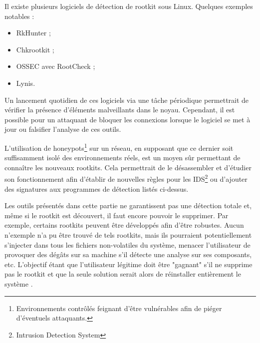 \documentclass[12pt]{article}
\begin{document}
    Il existe plusieurs logiciels de détection de rootkit sous Linux. Quelques exemples notables :
    \begin{itemize}
    	\item RkHunter\cite{rkhunter} ;
    	\item Chkrootkit\cite{chrootkit} ;
    	\item OSSEC avec RootCheck\cite{rootcheck} ;
    	\item Lynis\cite{lynis}.
    \end{itemize}
    
    Un lancement quotidien de ces logiciels via une tâche périodique permettrait de vérifier la présence d'éléments malveillants dans le noyau. Cependant, il est possible pour un attaquant de bloquer les connexions lorsque le logiciel se met à jour ou falsifier l'analyse de ces outils.
    
    
    L'utilisation de honeypots\footnote{Environnements contrôlés feignant d'être vulnérables afin de piéger d'éventuels attaquants.} sur un réseau, en supposant que ce dernier soit suffisamment isolé des environnements réels, est un moyen sûr permettant de connaître les nouveaux rootkits. Cela permettrait de le désassembler et d'étudier son fonctionnement afin d'établir de nouvelles règles pour les IDS\footnote{Intrusion Detection System} ou d'ajouter des signatures aux programmes de détection listés ci-dessus.
   
    Les outils présentés dans cette partie ne garantissent pas une détection totale et, même si le rootkit est découvert, il faut encore pouvoir le supprimer. Par exemple, certains rootkits peuvent être développés afin d'être robustes. Aucun n'exemple n'a pu être trouvé de tels rootkits, mais ils pourraient potentiellement s'injecter dans tous les fichiers non-volatiles du système, menacer l'utilisateur de provoquer des dégâts sur sa machine s'il détecte une analyse sur ses composants, etc. L'objectif étant que l'utilisateur légitime doit être "gagnant" s'il ne supprime pas le rootkit et que la seule solution serait alors de réinstaller entièrement le système \cite{sstic}.
    
\end{document}
